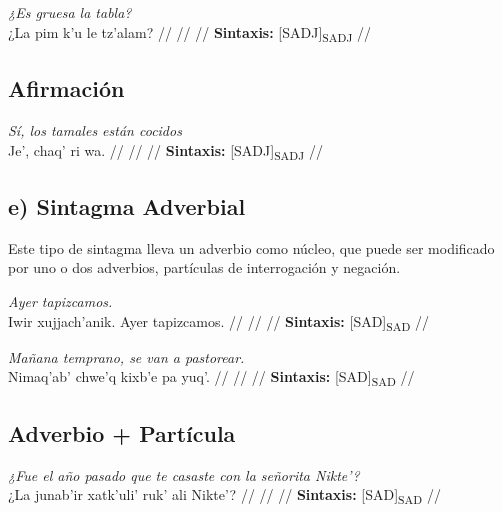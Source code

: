 \documentclass{article}%
\begin{document}
%
\par\medskip%
\ex
\textit{¿Es gruesa la tabla?} \\
\begingl
\gla ¿La pim k’u le tz'alam? //
\glb  //
\glc  //
\glft \textbf{Sintaxis:} [SADJ]\textsubscript{SADJ} //
\endgl
\xe
%
\medskip%
\subsection{Afirmación}%
\label{subsec:Afirmacin}%

%
\par\medskip%
\ex
\textit{Sí, los tamales están cocidos} \\
\begingl
\gla Je', chaq' ri wa. //
\glb  //
\glc  //
\glft \textbf{Sintaxis:} [SADJ]\textsubscript{SADJ} //
\endgl
\xe
%
\medskip%
\subsection{e) Sintagma Adverbial}%
\label{subsec:e)SintagmaAdverbial}%

%
Este tipo de sintagma lleva un adverbio como núcleo, que puede ser modificado por uno %
o dos adverbios, partículas de interrogación y negación. %
\par\medskip%
\ex
\textit{Ayer tapizcamos.} \\
\begingl
\gla Iwir xujjach'anik. Ayer tapizcamos. //
\glb  //
\glc  //
\glft \textbf{Sintaxis:} [SAD]\textsubscript{SAD} //
\endgl
\xe
%
\medskip%
\par\medskip%
\ex
\textit{Mañana temprano, se van a pastorear.} \\
\begingl
\gla Nimaq'ab' chwe'q kixb'e pa yuq'. //
\glb  //
\glc  //
\glft \textbf{Sintaxis:} [SAD]\textsubscript{SAD} //
\endgl
\xe
%
\medskip%
\subsection{Adverbio + Partícula}%
\label{subsec:Adverbio+Partcula}%

%
\par\medskip%
\ex
\textit{¿Fue el año pasado que te casaste con la señorita Nikte'?} \\
\begingl
\gla ¿La junab'ir xatk'uli' ruk' ali Nikte'? //
\glb  //
\glc  //
\glft \textbf{Sintaxis:} [SAD]\textsubscript{SAD} //
\endgl
\xe
%
\medskip

%
\end{document}
